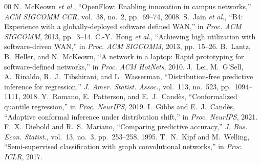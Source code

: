 \documentclass[conference]{IEEEtran}
\begin{document}
\begin{thebibliography}{00}
 N.~McKeown \emph{et al.}, ``OpenFlow:
Enabling innovation in campus networks,'' \emph{ACM SIGCOMM CCR},
vol.~38, no.~2, pp.~69--74, 2008.
 S.~Jain \emph{et al.}, ``B4: Experience with a
globally-deployed software defined WAN,'' in \emph{Proc. ACM
SIGCOMM}, 2013, pp.~3--14.
 C.-Y.~Hong \emph{et al.}, ``Achieving high
utilization with software-driven WAN,'' in \emph{Proc. ACM SIGCOMM},
2013, pp.~15--26.
 B.~Lantz, B.~Heller, and N.~McKeown, ``A
network in a laptop: Rapid prototyping for software-defined
networks,'' in \emph{Proc. ACM HotNets}, 2010.
 J.~Lei, M.~G'Sell, A.~Rinaldo,
R.~J.~Tibshirani, and L.~Wasserman, ``Distribution-free predictive
inference for regression,'' \emph{J. Amer. Statist. Assoc.},
vol.~113, no.~523, pp.~1094--1111, 2018.
 Y.~Romano, E.~Patterson, and
E.~J.~Cand\`es, ``Conformalized quantile regression,'' in
\emph{Proc. NeurIPS}, 2019.
 I.~Gibbs and E.~J.~Cand\`es, ``Adaptive
conformal inference under distribution shift,'' in \emph{Proc.
NeurIPS}, 2021.
 F.~X.~Diebold and R.~S.~Mariano,
``Comparing predictive accuracy,'' \emph{J. Bus. Econ. Statist.},
vol.~13, no.~3, pp.~253--258, 1995.
 T.~N.~Kipf and M.~Welling, ``Semi-supervised
classification with graph convolutional networks,'' in \emph{Proc.
ICLR}, 2017.
\end{thebibliography}

\balance
\end{document}
